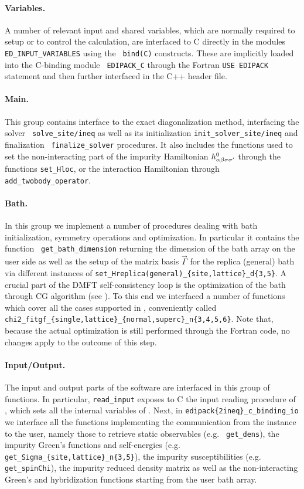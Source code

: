 \documentclass[edipack_sp.tex]{subfiles}
\begin{document}
\paragraph{{\bf Variables}.}
A number of relevant input and shared variables, which are normally
required to setup or to control the calculation, are interfaced to C
directly in the \NAME modules {\tt ED\_INPUT\_VARIABLES} using the {\tt
  bind(C)} constructs. These are implicitly loaded into the C-binding module {\tt
  EDIPACK\_C} through the Fortran {\tt USE EDIPACK} statement and
then further interfaced in the C++ header file. 


\paragraph{{\bf Main}.} This group contains interface to the exact
diagonalization method, interfacing the solver  {\tt
  solve\_site/ineq} as well as its initialization
{\tt init\_solver\_site/ineq} and finalization {\tt
  finalize\_solver} procedures. It also includes the functions used to
set the non-interacting part of the impurity Hamiltonian
$h^0_{\alpha\beta\sigma\sigma'}$ through the functions {\tt set\_Hloc}, or the
interaction Hamiltonian through {\tt add\_twobody\_operator}.


\paragraph{{\bf Bath}.} In this group we implement a number of
procedures dealing with bath initialization, symmetry operations and
optimization. In particular it contains the function {\tt
  get\_bath\_dimension} returning the
dimension of the bath array on the user side as well as the setup of the matrix basis
$\vec{\Gamma}$ for the replica (general) bath via different instances of
{\tt set\_Hreplica(general)\_\-\{site,lattice\}\_d\{3,5\}}. 
A crucial part of the DMFT self-consistency loop is the optimization of the bath through CG algorithm (see ). To this end we interfaced a
number of functions which
cover all the cases supported in \NAME, conveniently called {\tt
  chi2\_fitgf\_\{single,lattice\}\_\{normal,superc\}\_n\{3,4,5,6\}}. Note that, because the actual
optimization is still performed through the Fortran code, no changes
apply to the outcome of this step.    

\paragraph{{\bf Input/Output}.}
The input and output parts of the software are interfaced in this group
of functions. In particular, {\tt read\_input} exposes to C the input
reading procedure of \NAME, which sets all the internal
variables of \NAME.
Next, in {\tt edipack\{2ineq\}\_c\_binding\_io} we interface all the
functions implementing the communication from the \NAME instance to
the user, namely those to retrieve static observables (e.g. {\tt
  get\_dens}), the impurity Green's functions and self-energies
(e.g. {\tt get\_Sigma\_\{site,lattice\}\_n\{3,5\}}), the
impurity susceptibilities (e.g. {\tt get\_spinChi}), the impurity reduced density matrix as well
as the non-interacting Green's and hybridization functions starting from the user bath array.   
\end{document}
